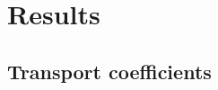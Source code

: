 \documentclass[aspectratio=169,11pt,usenames,dvipsnames]{beamer}
\renewcommand{\thefootnote}{\color{customblue}\faPaperPlaneO}
\newcommand\blfootnote[1]{%
  \begingroup
  \renewcommand\thefootnote{}\footnote{#1}%
  \addtocounter{footnote}{-1}%
  \endgroup
}
\begin{document}



\section{Results}






\subsection{Transport coefficients}

\end{document}
